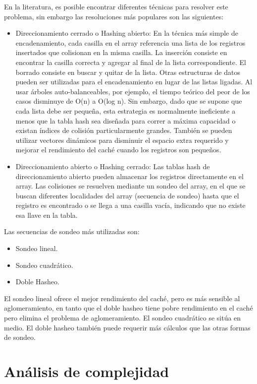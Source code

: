 \documentclass[letterpaper,openright,12pt]{report}
\begin{document}
En la literatura, es posible encontrar diferentes técnicas para resolver este problema, sin embargo las resoluciones más populares son las siguientes:
\begin{itemize}
\itemsep1pt\parskip0pt
\item
  Direccionamiento cerrado o Hashing abierto: En la técnica más simple de encadenamiento, cada casilla en el array referencia una lista de los registros insertados que colisionan en la misma casilla. La inserción consiste en encontrar la casilla correcta y agregar al final de la lista correspondiente. El borrado consiste en buscar y quitar de la lista.
  Otras estructuras de datos pueden ser utilizadas para el encadenamiento en lugar de las listas ligadas. Al usar árboles auto-balanceables, por ejemplo, el tiempo teórico del peor de los casos disminuye de O(n) a O(log n). Sin embargo, dado que se supone que cada lista debe ser pequeña, esta estrategia es normalmente ineficiente a menos que la tabla hash sea diseñada para correr a máxima capacidad o existan índices de colisión particularmente grandes. También se pueden utilizar vectores dinámicos para disminuir el espacio extra requerido y mejorar el rendimiento del caché cuando los registros son pequeños.
\newpage
\item
  Direccionamiento abierto o Hashing cerrado: Las tablas hash de direccionamiento abierto pueden almacenar los registros directamente en el array. Las colisiones se resuelven mediante un sondeo del array, en el que se buscan diferentes localidades del array (secuencia de sondeo) hasta que el registro es encontrado o se llega a una casilla vacía, indicando que no existe esa llave en la tabla.
\end{itemize}
  Las secuencias de sondeo más utilizadas son:
\begin{itemize}
\itemsep1pt\parskip0pt
\item
Sondeo lineal.
\item
Sondeo cuadrático.
\item
Doble Hasheo.
\end{itemize}

El sondeo lineal ofrece el mejor rendimiento del caché, pero es más sensible al aglomeramiento, en tanto que el doble hasheo tiene pobre rendimiento en el caché pero elimina el problema de aglomeramiento. El sondeo cuadrático se sitúa en medio. El doble hasheo también puede requerir más cálculos que las otras formas de sondeo.

\newpage

\section{Análisis de complejidad}
\end{document}
